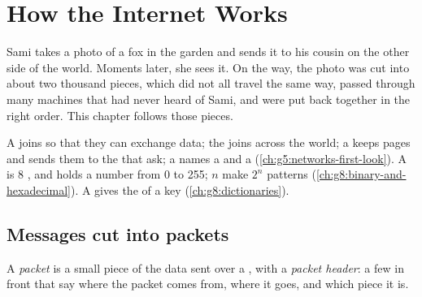 \chapter{How the Internet Works}\label{ch:g8:how-the-internet-works}

Sami takes a photo of a fox in the garden and sends it to his cousin on the
other side of the world. Moments later, she sees it. On the way,
the photo was cut into about two thousand pieces, which did not all travel
the same way, passed through many machines that had never heard of Sami,
and were put back together in the right order. This chapter follows those
pieces.

\begin{recall}
A  joins  so that they can exchange data; the  joins
 across the world; a  keeps pages and sends them to the
 that ask; a  names a  and a 
(\cref{ch:g5:networks-first-look}). A  is 8 , and holds a number from
0 to 255; $n$  make $2^n$ patterns (\cref{ch:g8:binary-and-hexadecimal}).
A  gives the  of a key (\cref{ch:g8:dictionaries}).
\end{recall}

\section{Messages cut into packets}

\begin{definition}\label{def:g8:how-the-internet-works:packet}
A \emph{packet} is a small piece of the data sent over a
, with a \emph{packet header}: a few  in
front that say where the packet comes from, where it goes, and which piece it
is.
\end{definition}

